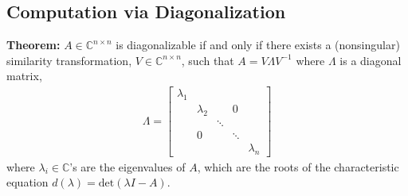\documentclass[twoside]{article}
\begin{document}
\subsection{Computation via Diagonalization}

\textbf{Theorem:} $A \in \mathbb{C}^{n \times n}$ is diagonalizable if and only if there exists a (nonsingular) similarity transformation, 
$V \in \mathbb{C}^{n \times n}$, such that $A = V \Lambda V^{-1}$ where $\Lambda$ is a diagonal matrix, 
%
\begin{align*}
	\Lambda = \left[ \begin{array}{ccccc} \lambda_1 &  & & &  \\  & \lambda_2  &  & 0 &  \\ &  & \ddots & \\ & 0 & & \ddots & \\ & &  & &  \lambda_n \end{array} \right]
\end{align*}
%
where $\lambda_i \in \mathbb{C}$'s are the eigenvalues of $A$, which are the roots of the characteristic equation $d(\lambda) = \mathrm{det}(\lambda I - A)$.
\end{document}
